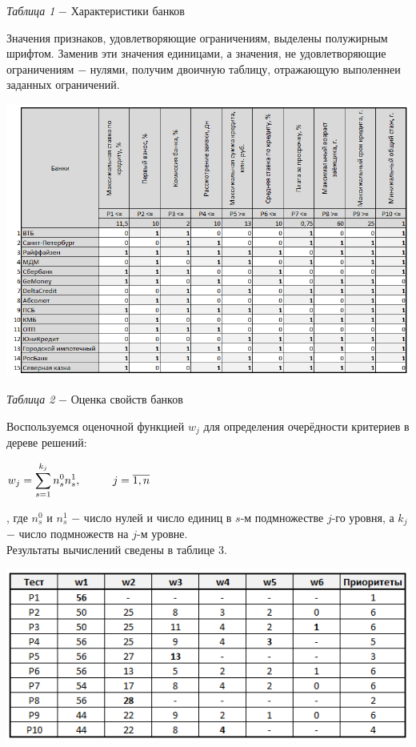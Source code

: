 \documentclass[14pt,fleqn]{extarticle}
\begin{document}
	\begin{center}
		\textit{Таблица 1} $-$ Характеристики банков
	\end{center}
	Значения признаков, удовлетворяющие ограничениям, выделены полужирным шрифтом. Заменив эти значения единицами, а значения, не удовлетворяющие ограничениям $-$ нулями, получим двоичную таблицу, отражающую выполеннеи заданных ограничений.
	\begin{center}
		\includegraphics[scale=0.82]{2}
	\end{center}
	\begin{center}
		\textit{Таблица 2} $-$ Оценка свойств банков
	\end{center}
	Воспользуемся оценочной функцией $w_j$ для определения очерёдности критериев в дереве решений:
	\begin{center}
		$w_j = \smashoperator[r]{\sum_{s = 1}^{k_j}}n^0_s n^1_s, \hspace*{1cm} j=\overline{1,n}$
	\end{center}
	, где $n^0_s$ и $n^1_s$ $-$ число нулей и число единиц в $s$-м подмножестве $j$-го уровня, а $k_j$ $-$ число подмножеств на $j$-м уровне.\\
	Результаты вычислений сведены в таблице 3.
	\newpage
	\begin{center}
		\includegraphics[scale=0.9]{3}
	\end{center}
\end{document}
